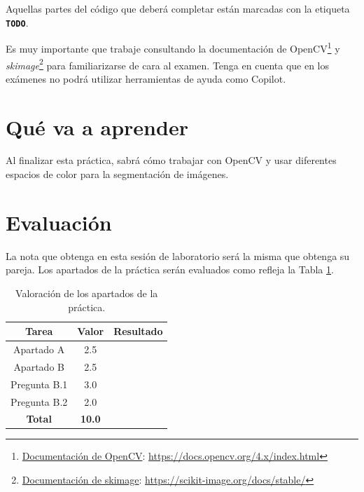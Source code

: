 Aquellas partes del código que deberá completar están marcadas con la etiqueta \textbf{\texttt{TODO}}.

Es muy importante que trabaje consultando la documentación de OpenCV\footnote{\href{https://docs.opencv.org/4.x/index.html}{Documentación de OpenCV}: \url{https://docs.opencv.org/4.x/index.html}} y \textit{skimage}\footnote{\href{https://scikit-image.org/docs/stable/}{Documentación de skimage}: \url{https://scikit-image.org/docs/stable/}} para familiarizarse de cara al examen. Tenga en cuenta que en los exámenes no podrá utilizar herramientas de ayuda como Copilot.

\section{Qué va a aprender}

Al finalizar esta práctica, sabrá cómo trabajar con OpenCV y usar diferentes espacios de color para la segmentación de imágenes.

\section{Evaluación}

La nota que obtenga en esta sesión de laboratorio será la misma que obtenga su pareja. Los apartados de la práctica serán evaluados como refleja la Tabla \ref{table:evaluacion}.

\begin{table}[h!]
    \centering
    \begin{tabular}{|c|c|c|}
    \hline
    \textbf{Tarea} & \textbf{Valor} & \textbf{Resultado} \\
    \hline
    Apartado A & 2.5 & \\
    \hline
    Apartado B & 2.5 & \\
    \hline
    Pregunta B.1 & 3.0 & \\
    \hline
    Pregunta B.2 & 2.0 & \\
    \hline
    \hline
    \textbf{Total} & \textbf{10.0} & \\
    \hline
    \end{tabular}
    \caption{Valoración de los apartados de la práctica.}
    \label{table:evaluacion}
\end{table}
